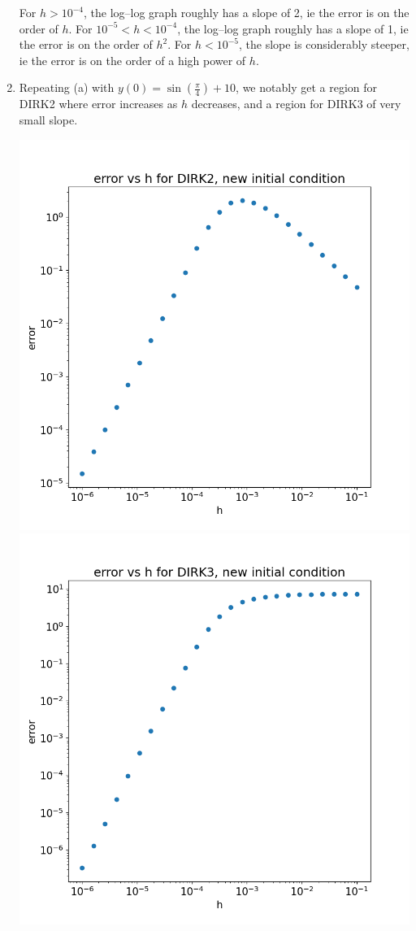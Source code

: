 \documentclass{article}
\begin{document}
\begin{enumerate}[label=(\alph*)]
For $h>10^{-4}$, the log--log graph roughly has a slope of 2, ie the error is on the order of $h$. For $10^{-5}<h<10^{-4}$, the log--log graph roughly has a slope of 1, ie the error is on the order of $h^2$. For $h<10^{-5}$, the slope is considerably steeper, ie the error is on the order of a high power of $h$.


\item Repeating (a) with $y(0)=\sin(\frac\pi4)+10$, we notably get a region for DIRK2 where error increases as $h$ decreases, and a region for DIRK3 of very small slope.

\begin{center}
	\includegraphics[scale=.3]{hw3 dirk2 err new ic}
	\includegraphics[scale=.3]{hw3 dirk3 err new ic}
\end{center}


\end{enumerate}
\end{document}
